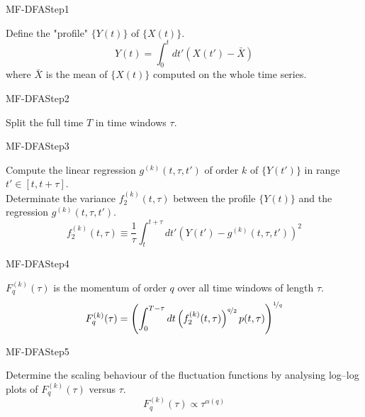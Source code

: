 \documentclass{beamer}
\begin{document}
\begin{frame}{MF-DFA}{Step1}
	\begin{block}{}
		Define the "profile" $\{Y(t)\}$ of $\{X(t)\}$.
		\begin{equation*}
			Y( t ) = \int_{0}^{t} dt' (X( t' ) - \bar{X} ) 
		\end{equation*}
		where $\bar{X}$ is the mean of $\{X(t)\}$ computed on the whole time series.
	\end{block}
\end{frame}

\begin{frame}{MF-DFA}{Step2}
	\begin{block}{}
			Split the full time $T$ in time windows $\tau$.
	\end{block}
\end{frame}

\begin{frame}{MF-DFA}{Step3}
	\begin{block}{}
		Compute the linear regression $ g^{( k )}(t, \tau, t') $ of order $k$ of $\{Y(t')\}$ in range $t' \in \left[t, t + \tau \right]$.
		\\
		Determinate the variance $ f_2^{( k )}( t, \tau ) $ between the profile $\{Y(t)\}$ and the regression $ g^{( k )}(t, \tau, t') $.
		\begin{equation*}
			f_{2}^{( k )}( t, \tau ) \equiv \frac{1}{\tau} \int_{t}^{t+\tau} dt' \left( Y( t' ) - g^{( k )}(t, \tau, t')  \right)^2
		\end{equation*}
	\end{block}
\end{frame}

\begin{frame}{MF-DFA}{Step4}
	\begin{block}{}
		$F_q^{( k )}(\tau )$ is the momentum of order $q$ over all time windows of length $\tau$.
		\begin{equation*}
			F_q^{( k )} ( \tau ) =  \left(\int_0^{T-\tau} dt \left( f_2^{( k )}( t, \tau ) \right)^{\nicefrac{q}{2}} p(t, \tau)  \right)^{\nicefrac{1}{q}}
		\end{equation*}
	\end{block}
\end{frame}

\begin{frame}{MF-DFA}{Step5}
	\begin{block}{}
		Determine the scaling behaviour of the fluctuation functions by analysing
		log–log plots of $F_q^{( k )}(\tau )$ versus $\tau$.
		\begin{equation*}
			F_q^{( k )}(\tau ) \propto \tau^{\alpha(q)}
		\end{equation*}
	\end{block}
\end{frame}
\end{document}
